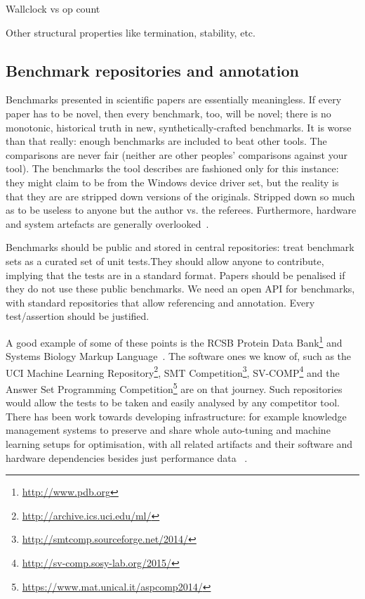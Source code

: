 \documentclass[conference]{IEEEtran}
\begin{document}
Wallclock vs op count

Other structural properties like termination, stability, etc. 

\subsection{Benchmark repositories and annotation}

Benchmarks presented in scientific papers are essentially
meaningless. If every paper has to be novel, then every benchmark,
too, will be novel; there is no monotonic, historical truth in new,
synthetically-crafted benchmarks. It is worse than that really: enough
benchmarks are included to beat other tools. The comparisons are never
fair (neither are other peoples' comparisons against your tool).  The
benchmarks the tool describes are fashioned only for this instance:
they might claim to be from the Windows device driver set, but the
reality is that they are are stripped down versions of the
originals. Stripped down so much as to be useless to anyone but the
author vs. the referees. Furthermore, hardware and system artefacts
are generally overlooked~\cite{brain+devos:2009}.

Benchmarks should be public and stored in central repositories: treat
benchmark sets as a curated set of unit tests.They should allow anyone
to contribute, implying that the tests are in a standard
format. Papers should be penalised if they do not use these public
benchmarks. We need an open API for benchmarks, with standard
repositories that allow referencing and annotation. Every
test/assertion should be justified.

A good example of some of these points is the RCSB Protein Data
Bank\footnote{\url{http://www.pdb.org}} and Systems Biology Markup
Language~\cite{Hucka2003,Chaouiya2013}. The software ones we know of,
such as the UCI Machine Learning
Repository\footnote{\url{http://archive.ics.uci.edu/ml/}}, SMT
Competition\footnote{\url{http://smtcomp.sourceforge.net/2014/}},
SV-COMP\footnote{\url{http://sv-comp.sosy-lab.org/2015/}} and the
Answer Set Programming
Competition\footnote{\url{https://www.mat.unical.it/aspcomp2014/}} are
on that journey. Such repositories would allow the tests to be taken
and easily analysed by any competitor tool. There has been work
towards developing infrastructure: for example knowledge management
systems to preserve and share whole auto-tuning and machine learning
setups for optimisation, with all related artifacts and their software
and hardware dependencies besides just performance data
~\cite{fursin-et-al:2014}.
\end{document}
